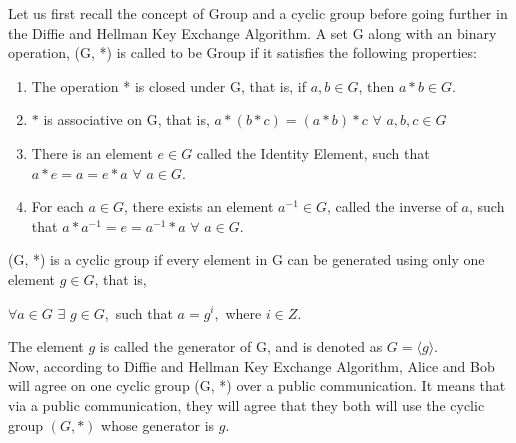 \documentclass[11pt]{article}
\begin{document}
Let us first recall the concept of Group and a cyclic group before going further in the Diffie and Hellman Key Exchange Algorithm. A set G along with an binary operation, (G, *) is called to be Group if it satisfies the following properties:
\begin{enumerate}
    \item The operation * is closed under G, that is, if $a, b \in G$, then $a * b \in G$.
    \item $*$ is associative on G, that is, $a * (b * c) = (a * b) * c$ $ \forall$ $ a,b,c \in G$
    \item There is an element $e \in G$ called the Identity Element, such that $a * e = a = e * a$ $\forall$ $a \in G$.
    \item For each $a \in G$, there exists an element $a^{-1} \in G$, called the inverse of $a$, such that $a * a^{-1} = e = a^{-1} * a$ $\forall$ $a \in G$. 
\end{enumerate}
(G, *) is a cyclic group if every element in G can be generated using only one element $g \in G$, that is,
\begin{center}
    $\forall a \in G$ $ \exists$ $g \in G,$ such that $a = g^i,$ where $i \in Z$.
\end{center}
The element $g$ is called the generator of G, and is denoted as $G = \langle g \rangle$.\\
\newline
Now, according to Diffie and Hellman Key Exchange Algorithm, Alice and Bob will agree on one cyclic group (G, *) over a public communication. It means that via a public communication, they will agree that they both will use the cyclic group $(G, *)$ whose generator is $g$.
\end{document}
